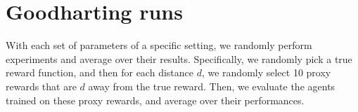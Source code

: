 \section{Goodharting runs}\label{appendix:environments}

With each set of parameters of a specific setting, we randomly perform experiments and average over their results. Specifically, we randomly pick a true reward function, and then for each distance $d$, we randomly select 10 proxy rewards that are $d$ away from the true reward. Then, we evaluate the agents trained on these proxy rewards, and average over their performances.